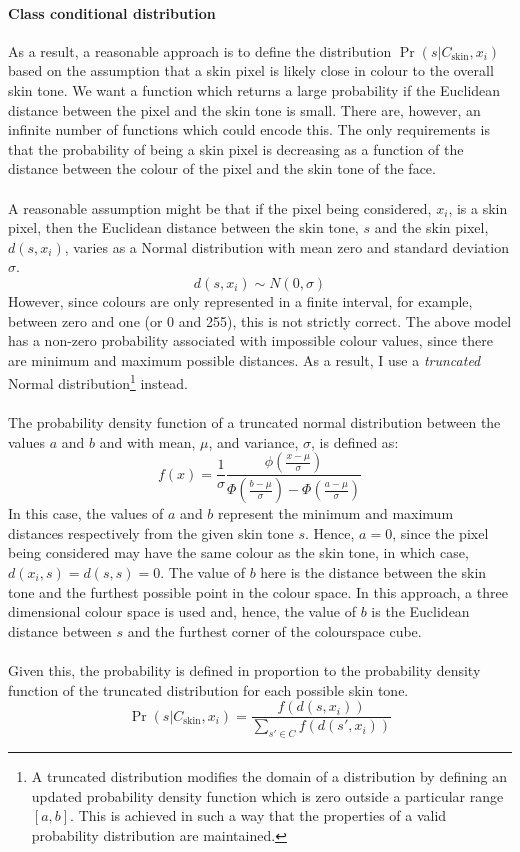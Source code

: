 \paragraph{Class conditional distribution}
As a result, a reasonable approach is to define the distribution $\Pr(s|C_\mathrm{skin}, x_i)$ based on the assumption that a skin pixel is likely close in colour to the overall skin tone. We want a function which returns a large probability if the Euclidean distance between the pixel and the skin tone is small.
There are, however, an infinite number of functions which could encode this. The only requirements is that the probability of being a skin pixel is decreasing as a function of the distance between the colour of the pixel and the skin tone of the face. 
\\\\
A reasonable assumption might be that if the pixel being considered, $x_i$, is a skin pixel, then the Euclidean distance between the skin tone, $s$ and the skin pixel, $d(s,x_i)$, varies as a Normal distribution with mean zero and standard deviation $\sigma$.
\begin{equation*}
   d(s, x_i) \sim N(0, \sigma) 
\end{equation*}
However, since colours are only represented in a finite interval, for example, between zero and one (or 0 and 255), this is not strictly correct. 
The above model has a non-zero probability associated with impossible colour values, since there are minimum and maximum possible distances.
As a result, I use a \textit{truncated} Normal distribution\footnote{A truncated distribution modifies the domain of a distribution by defining an updated probability density function which is zero outside a particular range $[a,b]$. This is achieved in such a way that the properties of a valid probability distribution are maintained.} instead.
\\\\
The probability density function of a truncated normal distribution between the values $a$ and $b$ and with mean, $\mu$, and variance, $\sigma$, is defined as: 
\begin{equation*}
    f(x) = \frac{1}{\sigma}\frac{\phi(\frac{x-\mu}{\sigma})}{\Phi(\frac{b-\mu}{\sigma}) - \Phi(\frac{a-\mu}{\sigma})}
\end{equation*}
\noindent
In this case, the values of $a$ and $b$ represent the minimum and maximum distances respectively from the given skin tone $s$. 
Hence, $a=0$, since the pixel being considered may have the same colour as the skin tone, in which case, $d(x_i, s) = d(s, s) = 0$.
The value of $b$ here is the distance between the skin tone and the furthest possible point in the colour space.
In this approach, a three dimensional colour space is used and, hence, the value of $b$ is the Euclidean distance between $s$ and the furthest corner of the colourspace cube.
\\\\
Given this, the probability is defined in proportion to the probability density function of the truncated distribution for each possible skin tone.
\begin{equation*}
    \Pr(s|C_\mathrm{skin}, x_i) = \frac{f(d(s,x_i))}{\sum_{s' \in C}f(d(s',x_i))}
\end{equation*}
